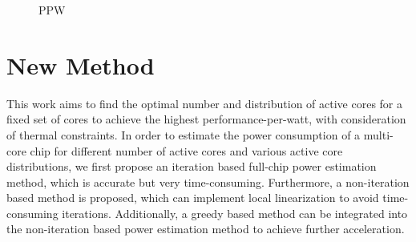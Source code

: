 \begin{figure}[htb]
\centering
{}
\caption{PPW}  
\label{fig:ppw}
\end{figure}

\section{New Method}

This work aims to find the optimal number and distribution of active cores for a fixed set of cores to achieve the highest performance-per-watt, with consideration of thermal constraints. In order to estimate the power consumption of a multi-core chip for different number of active cores and various active core distributions, we first propose an iteration based full-chip power estimation method, which is accurate but very time-consuming. Furthermore, a non-iteration based method is proposed, which can implement local linearization to avoid time-consuming iterations. Additionally, a greedy based method can be integrated into the non-iteration based power estimation method to achieve further acceleration.

